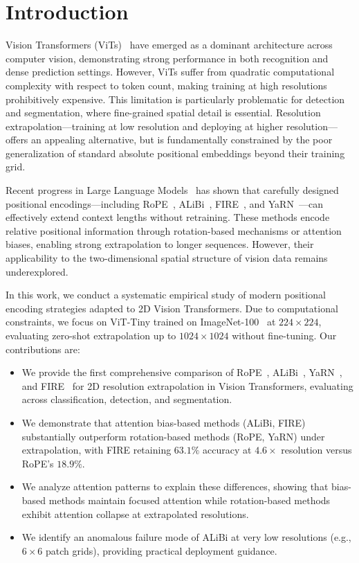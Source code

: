 \section{Introduction}
\label{sec:intro}


Vision Transformers (ViTs)~\cite{dosovitskiy2021image} have emerged as a dominant architecture across computer vision, demonstrating strong performance in both recognition and dense prediction settings. However, ViTs suffer from quadratic computational complexity with respect to token count, making training at high resolutions prohibitively expensive. This limitation is particularly problematic for detection and segmentation, where fine-grained spatial detail is essential. Resolution extrapolation---training at low resolution and deploying at higher resolution---offers an appealing alternative, but is fundamentally constrained by the poor generalization of standard absolute positional embeddings beyond their training grid.

Recent progress in Large Language Models~\cite{touvron2023llama} has shown that carefully designed positional encodings---including RoPE~\cite{su2024roformer}, ALiBi~\cite{press2022train}, FIRE~\cite{li2024functional}, and YaRN~\cite{peng2024yarn}---can effectively extend context lengths without retraining. These methods encode relative positional information through rotation-based mechanisms or attention biases, enabling strong extrapolation to longer sequences. However, their applicability to the two-dimensional spatial structure of vision data remains underexplored.

In this work, we conduct a systematic empirical study of modern positional encoding strategies adapted to 2D Vision Transformers. Due to computational constraints, we focus on ViT-Tiny trained on ImageNet-100~\cite{deng2009imagenet} at $224 \times 224$, evaluating zero-shot extrapolation up to $1024 \times 1024$ without fine-tuning. Our contributions are:
\begin{itemize}
    \item We provide the first comprehensive comparison of RoPE~\cite{su2024roformer,heo2024rope}, ALiBi~\cite{press2022train}, YaRN~\cite{peng2024yarn}, and FIRE~\cite{li2024functional} for 2D resolution extrapolation in Vision Transformers, evaluating across classification, detection, and segmentation.
    \item We demonstrate that attention bias-based methods (ALiBi, FIRE) substantially outperform rotation-based methods (RoPE, YaRN) under extrapolation, with FIRE retaining $63.1\%$ accuracy at $4.6\times$ resolution versus RoPE's $18.9\%$.
    \item We analyze attention patterns to explain these differences, showing that bias-based methods maintain focused attention while rotation-based methods exhibit attention collapse at extrapolated resolutions.
    \item We identify an anomalous failure mode of ALiBi at very low resolutions (e.g., $6 \times 6$ patch grids), providing practical deployment guidance.
\end{itemize}
